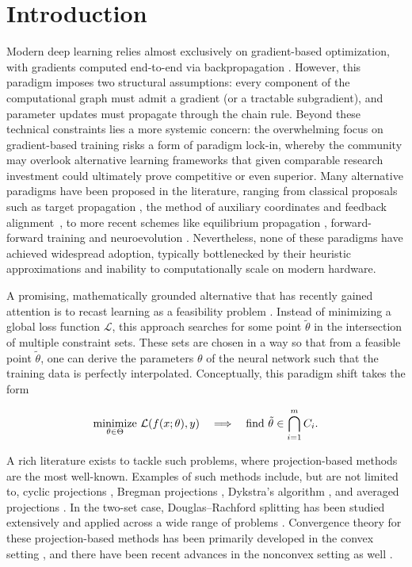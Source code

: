\chapter{Introduction}
Modern deep learning relies almost exclusively on gradient-based optimization, with gradients computed end-to-end via backpropagation \cite{rumelhart1986learning}. However, this paradigm imposes two structural assumptions: every component of the computational graph must admit a gradient (or a tractable subgradient), and parameter updates must propagate through the chain rule. Beyond these technical constraints lies a more systemic concern: the overwhelming focus on gradient-based training risks a form of paradigm lock-in, whereby the community may overlook alternative learning frameworks that given comparable research investment could ultimately prove competitive or even superior. Many alternative paradigms have been proposed in the literature, ranging from classical proposals such as target propagation \cite{lee2015difference}, the method of auxiliary coordinates \cite{carreira2014distributed} and feedback alignment~\cite{lillicrap2016random}, to more recent schemes like equilibrium propagation \cite{scellier2017equilibrium}, forward-forward training \cite{hinton2022forward} and neuroevolution \cite{such2017deep}. Nevertheless, none of these paradigms have achieved widespread adoption, typically bottlenecked by their heuristic approximations and inability to computationally scale on modern hardware.

A promising, mathematically grounded alternative that has recently gained attention is to recast learning as a feasibility problem \cite{elser2019learning, bergmeister2025projection, elser2026learning}. Instead of minimizing a global loss function $\mathcal{L}$, this approach searches for some point $\tilde{\theta}$ in the intersection of multiple constraint sets. These sets are chosen in a way so that from a feasible point $\tilde{\theta}$, one can derive the parameters $\theta$ of the neural network such that the training data is perfectly interpolated. Conceptually, this paradigm shift takes the form
\begin{tcolorbox}
\[
\operatorname*{minimize}_{\theta \in \Theta}\, \mathcal{L}(f(x;\theta), y)
\quad \Longrightarrow \quad
\textnormal{find } \tilde{\theta} \in \bigcap_{i=1}^{m} C_i.
\]\end{tcolorbox}
A rich literature exists to tackle such problems, where projection-based methods are the most well-known. Examples of such methods include, but are not limited to, cyclic projections \cite{gubin1967method}, Bregman projections \cite{bregman1967relaxation}, Dykstra's algorithm \cite{dykstra1983algorithm}, and averaged projections \cite{auslender_thesis}. In the two-set case, Douglas--Rachford splitting \cite{douglas1956numerical,eckstein1992douglas} has been studied extensively and applied across a wide range of problems \cite{bauschke2021douglasrachfordalgorithmsolvingpossibly, lindstrom2020surveyyearsdouglasrachford}. Convergence theory for these projection-based methods has been primarily developed in the convex setting \cite{bauschke1996projection}, and there have been recent advances in the nonconvex setting as well \cite{themelis2020douglas,attouch2013convergence,li2016douglas}.

